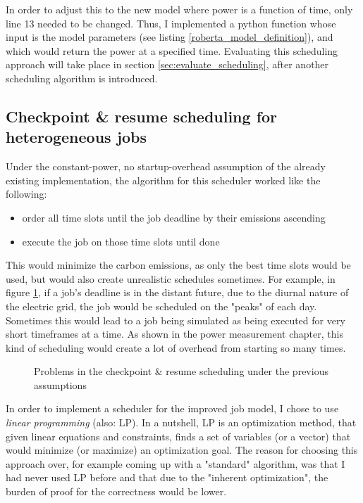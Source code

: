 In order to adjust this to the new model where power is a function of time, only line 13 needed to be changed. 
Thus, I implemented a python function whose input is the model parameters (see listing \ref{roberta_model_definition}), and which would return the power at a specified time. 
Evaluating this scheduling approach will take place in section \ref{sec:evaluate_scheduling}, after another scheduling algorithm is introduced.


\subsection{{Checkpoint \& resume scheduling for heterogeneous jobs}} \label{sec:checkpoint_resume_lp}

Under the constant-power, no startup-overhead assumption of the already existing implementation, the algorithm for this scheduler worked like the following:

\begin{itemize}
    \item order all time slots until the job deadline by their emissions ascending
    \item execute the job on those time slots until done
\end{itemize}

This would minimize the carbon emissions, as only the best time slots would be used, but would also create unrealistic schedules sometimes. 
For example, in figure \ref{fig:schedule_problems}, if a job's deadline is in the distant future, due to the diurnal nature of the electric grid, the job would be scheduled on the "peaks" of each day. Sometimes this would lead to a job being simulated as being executed for very short timeframes at a time. As shown in the power measurement chapter, this kind of scheduling would create a lot of overhead from starting so many times.

\begin{figure}
    \caption{Problems in the checkpoint \& resume scheduling under the previous assumptions}
    \label{fig:schedule_problems}
\end{figure}


In order to implement a scheduler for the improved job model, I chose to use \emph{linear programming} (also: LP).
In a nutshell, LP is an optimization method, that given linear equations and constraints, finds a set of variables (or a vector) that would minimize (or maximize) an optimization goal. 
The reason for choosing this approach over, for example coming up with a "standard" algorithm, was that I had never used LP before and that due to the "inherent optimization", the burden of proof for the correctness would be lower.

